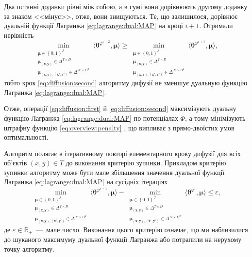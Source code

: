 Два останні доданки рівні між собою,
а в сумі вони дорівнюють другому доданку за знаком <<мінус>>, отже,
вони знищуються.
Те, що залишилося,
дорівнює дуальній функції Лагранжа \eqref{eq:lagrange:dual:MAP}
на кроці $i + 1$.
Отримали нерівність
\begin{equation*}
    \min \limits_{\substack{\pmb{\mu} \in \left\{ 0, 1 \right\}^{\mathcal{I}} \\
                            \pmb{\mu_{\left(x, y \right)}} \in \Delta^{T \times D} \\
                            \pmb{\mu_{\left(x, y \right), \left(x', y' \right)}} \in
                                \Delta^{\mathcal{N} \times D^2}}}
        \langle \pmb{\theta}^{\varphi^{i + 2}}, \pmb{\mu} \rangle \ge
    \min \limits_{\substack{\pmb{\mu} \in \left\{ 0, 1 \right\}^{\mathcal{I}} \\
                            \pmb{\mu_{\left(x, y \right)}} \in \Delta^{T \times D} \\
                            \pmb{\mu_{\left(x, y \right), \left(x', y' \right)}} \in
                                \Delta^{\mathcal{N} \times D^2}}}
        \langle \pmb{\theta}^{\varphi^{i + 1}}, \pmb{\mu} \rangle,
\end{equation*}
тобто крок \eqref{eq:diffusion:second}
алгоритму дифузії не зменшує дуальную функцію Лагранжа
\eqref{eq:lagrange:dual:MAP}.

Отже,
операції \eqref{eq:diffusion:first} й
\eqref{eq:diffusion:second} максимізують дуальну функцію Лагранжа
\eqref{eq:lagrange:dual:MAP} по потенціалах
$\Phi$, а тому мінімізують штрафну функцію \eqref{eq:overview:penalty}
\cite{overview:savchynskyy:diffusion},
що випливає з прямо-двоїстих умов оптимальності.

Алгоритм полягає в ітеративному повторі елементарного кроку дифузії для всіх об'єктів
$\left(x, y \right) \in T$ до виконання критерію зупинки.
Прикладом критерію зупинки алгоритму може бути мале збільшення
значення дуальної функції Лагранжа \eqref{eq:lagrange:dual:MAP}
на сусідніх ітераціях
\begin{equation*}
    \min \limits_{\substack{\pmb{\mu} \in \left\{ 0, 1 \right\}^{\mathcal{I}} \\
                            \pmb{\mu_{\left(x, y \right)}} \in \Delta^{T \times D} \\
                            \pmb{\mu_{\left(x, y \right), \left(x', y' \right)}} \in
                                \Delta^{\mathcal{N} \times D^2}}}
        \langle \pmb{\theta}^{\varphi^{i + 1}}, \pmb{\mu} \rangle -
    \min \limits_{\substack{\pmb{\mu} \in \left\{ 0, 1 \right\}^{\mathcal{I}} \\
                            \pmb{\mu_{\left(x, y \right)}} \in \Delta^{T \times D} \\
                            \pmb{\mu_{\left(x, y \right), \left(x', y' \right)}} \in
                                \Delta^{\mathcal{N} \times D^2}}}
        \langle \pmb{\theta}^{\varphi^i}, \pmb{\mu} \rangle \le \varepsilon,
\end{equation*}
де $\varepsilon \in \mathbb{R}_+$~---~мале число.
Виконання цього критерію означає,
що ми наблизилися до шуканого максимуму дуальної функції Лагранжа
або потрапили на нерухому точку алгоритму.

